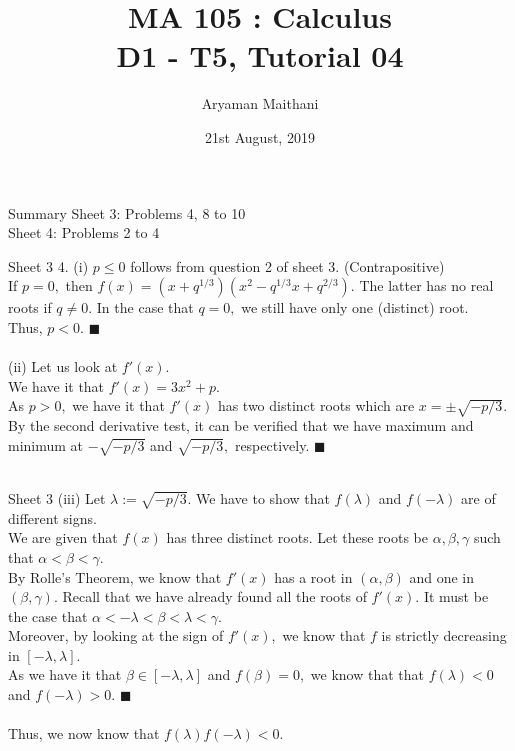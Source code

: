 \documentclass[handout, aspectratio=169]{beamer}
\title{MA 105 : Calculus\\ D1 - T5, Tutorial 04}  %
\author{Aryaman Maithani}
\date[21-08-2019]{21st August, 2019}               %
\institute[IITB]{IIT Bombay}
\begin{document}
\begin{frame}
	\titlepage
\end{frame}
\begin{frame}{Summary} 
	Sheet 3: Problems 4, 8 to 10\\	
	Sheet 4: Problems 2 to 4
\end{frame}
\begin{frame}{Sheet 3}                            %
	4. (i) $p \le 0$ follows from question 2 of sheet 3. (Contrapositive)\\
	If $p = 0,$ then $f(x) = (x + q^{1/3})(x^2 - q^{1/3}x + q^{2/3}).$ The latter has no real roots if $q \neq 0.$ In the case that $q = 0,$ we still have only one (distinct) root.\\
	Thus, $p < 0.$ \hfill $\blacksquare$ \\~\\
	(ii) Let us look at $f'(x).$ \\
	We have it that $f'(x) = 3x^2 + p.$\\
	As $p > 0,$ we have it that $f'(x)$ has two distinct roots which are $x = \pm \sqrt{-p/3}.$\\
	By the second derivative test, it can be verified that we have maximum and minimum at $-\sqrt{-p/3}$ and $\sqrt{-p/3},$ respectively. \hfill $\blacksquare$ \\~\\
\end{frame}
\begin{frame}{Sheet 3}
	(iii) Let $\lambda := \sqrt{-p/3}.$ We have to show that $f(\lambda)$ and $f(-\lambda)$ are of different signs.\\
	We are given that $f(x)$ has three distinct roots. Let these roots be $\alpha, \beta, \gamma$ such that $\alpha < \beta < \gamma.$\\
	By Rolle's Theorem, we know that $f'(x)$ has a root in $(\alpha, \beta)$ and one in $(\beta, \gamma).$ Recall that we have already found all the roots of $f'(x).$ It must be the case that $\alpha < -\lambda < \beta < \lambda < \gamma.$\\
	Moreover, by looking at the sign of $f'(x),$ we know that $f$ is strictly decreasing in $[-\lambda, \lambda].$\\
	As we have it that $\beta \in [-\lambda, \lambda]$ and $f(\beta) = 0,$ we know that that $f(\lambda) < 0$ and $f(-\lambda) > 0.$ \hfill $\blacksquare$\\~\\
	Thus, we now know that $f(\lambda)f(-\lambda) < 0.$
\end{frame}
\end{document}
